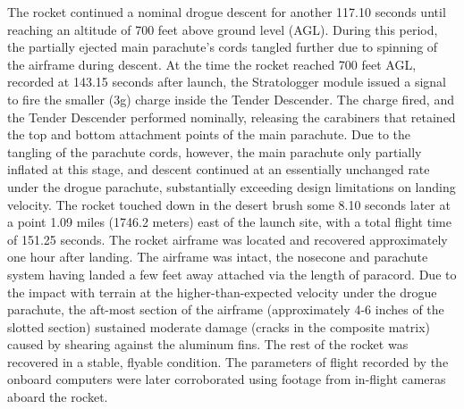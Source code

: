 The rocket continued a nominal drogue descent for another 117.10 seconds until reaching an altitude of 700 feet above ground level (AGL). During this period, the partially ejected main parachute’s cords tangled further due to spinning of the airframe during descent. At the time the rocket reached 700 feet AGL, recorded at 143.15 seconds after launch, the Stratologger module issued a signal to fire the smaller (3g) charge inside the Tender Descender. The charge fired, and the Tender Descender performed nominally, releasing the carabiners that retained the top and bottom attachment points of the main parachute. Due to the tangling of the parachute cords, however, the main parachute only partially inflated at this stage, and descent continued at an essentially unchanged rate under the drogue parachute, substantially exceeding design limitations on landing velocity. The rocket touched down in the desert brush some 8.10 seconds later at a point 1.09 miles (1746.2 meters) east of the launch site, with a total flight time of 151.25 seconds. 
\newline\newline
The rocket airframe was located and recovered approximately one hour after landing. The airframe was intact, the nosecone and parachute system having landed a few feet away attached via the length of paracord. Due to the impact with terrain at the higher-than-expected velocity under the drogue parachute, the aft-most section of the airframe (approximately 4-6 inches of the slotted section) sustained moderate damage (cracks in the composite matrix) caused by shearing against the aluminum fins. The rest of the rocket was recovered in a stable, flyable condition. The parameters of flight recorded by the onboard computers were later corroborated using footage from in-flight cameras aboard the rocket.